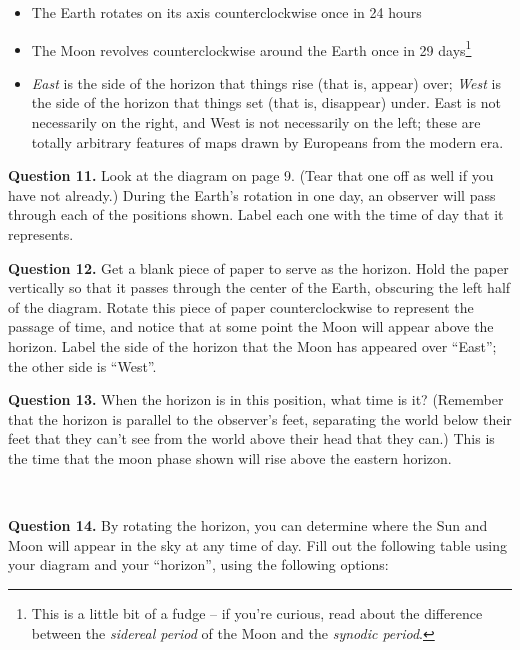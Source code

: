 \documentclass[11pt]{article}
\begin{document}
\begin{itemize}
	\item The Earth rotates on its axis counterclockwise once in 24 hours
	\item The Moon revolves counterclockwise around the Earth once in 29 days\footnote{This is a little bit of a fudge -- if you're curious, read about the difference between the {\it sidereal period} of the Moon and the {\it synodic period}.}
	\item {\it East} is the side of the horizon that things rise (that is, appear) over; {\it West} is the side of the horizon that things set (that is, disappear) under. East is not necessarily on the right, and West is not necessarily on the left; these are totally arbitrary features of maps drawn by Europeans from the modern era.
\end{itemize}


\textbf{Question 11.} Look at the diagram on page 9. (Tear that one off as well if you have not already.) During the Earth's rotation in one day, an observer will pass through each of the positions shown. Label each one with the time of day that it represents.

\textbf{Question 12.} Get a blank piece of paper to serve as the horizon. Hold the paper vertically so that it passes through the center of the Earth, obscuring the left half of the diagram. Rotate this piece of paper counterclockwise to represent the passage of time, and notice that at some point the Moon will appear above the horizon. Label the side of the horizon that the Moon has appeared over ``East''; the other side is ``West''.

\textbf{Question 13.} When the horizon is in this position, what time is it? (Remember that the horizon is parallel to the observer's feet, separating the world below their feet that they can't see from the world above their head that they can.) This is the time that the moon phase shown will rise above the eastern horizon.

\vspace*{1.5cm}

\hrulefill\\
\newpage

\textbf{Question 14.} By rotating the horizon, you can determine where the Sun and Moon will appear in the sky at any time of day. Fill out the following table using your diagram and your ``horizon'', using the following options:
\end{document}
